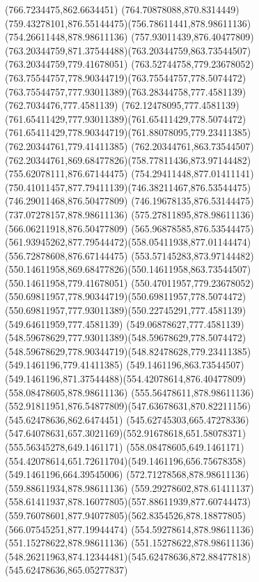 {	\lineto(766.7234475,862.6634451)
	\curveto(764.70878088,870.8314449)(759.43278101,876.55144475)(756.78611441,878.98611136)
	\lineto(754.26611448,878.98611136)
	\curveto(757.93011439,876.40477809)(763.20344759,871.37544488)(763.20344759,863.73544507)
	\lineto(763.20344759,779.41678051)
	\curveto(763.52744758,779.23678052)(763.75544757,778.90344719)(763.75544757,778.5074472)
	\curveto(763.75544757,777.93011389)(763.28344758,777.4581139)(762.7034476,777.4581139)
	\curveto(762.12478095,777.4581139)(761.65411429,777.93011389)(761.65411429,778.5074472)
	\curveto(761.65411429,778.90344719)(761.88078095,779.23411385)(762.20344761,779.41411385)
	\lineto(762.20344761,863.73544507)
	\curveto(762.20344761,869.68477826)(758.77811436,873.97144482)(755.62078111,876.67144475)
	\curveto(754.29411448,877.01411141)(750.41011457,877.79411139)(746.38211467,876.53544475)
	\lineto(746.29011468,876.50477809)
	\lineto(746.19678135,876.53144475)
	\lineto(737.07278157,878.98611136)
	\lineto(575.27811895,878.98611136)
	\lineto(566.06211918,876.50477809)
	\lineto(565.96878585,876.53544475)
	\curveto(561.93945262,877.79544472)(558.05411938,877.01144474)(556.72878608,876.67144475)
	\curveto(553.57145283,873.97144482)(550.14611958,869.68477826)(550.14611958,863.73544507)
	\lineto(550.14611958,779.41678051)
	\curveto(550.47011957,779.23678052)(550.69811957,778.90344719)(550.69811957,778.5074472)
	\curveto(550.69811957,777.93011389)(550.22745291,777.4581139)(549.64611959,777.4581139)
	\curveto(549.06878627,777.4581139)(548.59678629,777.93011389)(548.59678629,778.5074472)
	\curveto(548.59678629,778.90344719)(548.82478628,779.23411385)(549.1461196,779.41411385)
	\lineto(549.1461196,863.73544507)
	\curveto(549.1461196,871.37544488)(554.42078614,876.40477809)(558.08478605,878.98611136)
	\lineto(555.56478611,878.98611136)
	\curveto(552.91811951,876.54877809)(547.63678631,870.82211156)(545.62478636,862.6474451)
	\lineto(545.62745303,665.47278336)
	\curveto(547.64078631,657.3021169)(552.91678618,651.58078371)(555.56345278,649.1461171)
	\lineto(558.08478605,649.1461171)
	\curveto(554.42078614,651.72611704)(549.1461196,656.75678358)(549.1461196,664.39545006)
	\moveto(572.71278568,878.98611136)
	\lineto(559.88611934,878.98611136)
	\curveto(559.29278602,878.61411137)(558.61411937,878.16077805)(557.88611939,877.60744473)
	\curveto(559.76078601,877.94077805)(562.8354526,878.18877805)(566.07545251,877.19944474)
	\closepath
	\moveto(554.59278614,878.98611136)
	\lineto(551.15278622,878.98611136)
	\curveto(551.15278622,878.98611136)(548.26211963,874.12344481)(545.62478636,872.88477818)
	\lineto(545.62478636,865.05277837)
}
